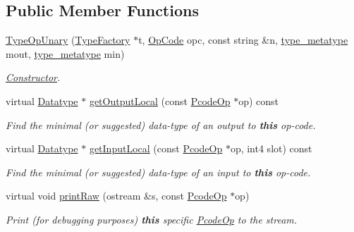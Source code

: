 \subsection*{Public Member Functions}
\begin{DoxyCompactItemize}
\item 
\mbox{\hyperlink{class_type_op_unary_ab24fc74e370f34dd61f488825fca2dc7}{Type\+Op\+Unary}} (\mbox{\hyperlink{class_type_factory}{Type\+Factory}} $\ast$t, \mbox{\hyperlink{opcodes_8hh_abeb7dfb0e9e2b3114e240a405d046ea7}{Op\+Code}} opc, const string \&n, \mbox{\hyperlink{type_8hh_aef6429f2523cdf4d415ba04a0209e61f}{type\+\_\+metatype}} mout, \mbox{\hyperlink{type_8hh_aef6429f2523cdf4d415ba04a0209e61f}{type\+\_\+metatype}} min)
\begin{DoxyCompactList}\small\item\em \mbox{\hyperlink{class_constructor}{Constructor}}. \end{DoxyCompactList}\item 
virtual \mbox{\hyperlink{class_datatype}{Datatype}} $\ast$ \mbox{\hyperlink{class_type_op_unary_a33872e1381109a5fdb1030a2771e0c6e}{get\+Output\+Local}} (const \mbox{\hyperlink{class_pcode_op}{Pcode\+Op}} $\ast$op) const
\begin{DoxyCompactList}\small\item\em Find the minimal (or suggested) data-\/type of an output to {\bfseries{this}} op-\/code. \end{DoxyCompactList}\item 
virtual \mbox{\hyperlink{class_datatype}{Datatype}} $\ast$ \mbox{\hyperlink{class_type_op_unary_a80df02d6ff2783f44b3c9dca6f580044}{get\+Input\+Local}} (const \mbox{\hyperlink{class_pcode_op}{Pcode\+Op}} $\ast$op, int4 slot) const
\begin{DoxyCompactList}\small\item\em Find the minimal (or suggested) data-\/type of an input to {\bfseries{this}} op-\/code. \end{DoxyCompactList}\item 
virtual void \mbox{\hyperlink{class_type_op_unary_a05cfe8c1ca862ce3d1e5b994ab98746b}{print\+Raw}} (ostream \&s, const \mbox{\hyperlink{class_pcode_op}{Pcode\+Op}} $\ast$op)
\begin{DoxyCompactList}\small\item\em Print (for debugging purposes) {\bfseries{this}} specific \mbox{\hyperlink{class_pcode_op}{Pcode\+Op}} to the stream. \end{DoxyCompactList}\end{DoxyCompactItemize}
